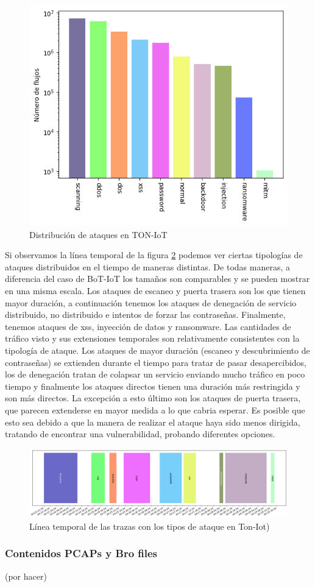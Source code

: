 \begin{figure}[H]
  \begin{center}
      \includegraphics[width=0.49\linewidth]{media/toniot_csv_results.png}
  \end{center}
  \captionsetup{justification=centering}
  \caption{Distribución de ataques en TON-IoT}\label{fig:toniot_results}
\end{figure}

Si observamos la línea temporal de la figura \ref{fig:toniot_timeline} podemos ver ciertas tipologías de ataques distribuidos en el tiempo de maneras distintas. De todas maneras, a diferencia del caso de BoT-IoT los tamaños son comparables y se pueden mostrar en una misma escala. Los ataques de escaneo y puerta trasera son los que tienen mayor duración, a continuación tenemos los ataques de denegación de servicio distribuido, no distribuido e intentos de forzar las contraseñas. Finalmente, tenemos ataques de xss, inyección de datos y ransomware. Las cantidades de tráfico visto y sus extensiones temporales son relativamente consistentes con la tipología de ataque. Los ataques de mayor duración (escaneo y descubrimiento de contraseñas) se extienden durante el tiempo para tratar de pasar desapercibidos, los de denegación tratan de colapsar un servicio enviando mucho tráfico en poco tiempo y finalmente los ataques directos tienen una duración más restringida y son más directos. La excepción a esto último son los ataques de puerta trasera, que parecen extenderse en mayor medida a lo que cabria esperar. Es posible que esto sea debido a que la manera de realizar el ataque haya sido menos dirigida, tratando de encontrar una vulnerabilidad, probando diferentes opciones.

\begin{figure}[!htb]
  \begin{center}
      \includegraphics[width=1\linewidth]{media/toniot_csv_timeline.png}
  \end{center}
  \captionsetup{justification=centering}
  \caption{Línea temporal de las trazas con los tipos de ataque en Ton-Iot)}\label{fig:toniot_timeline}
\end{figure}

\subsubsection{Contenidos PCAPs y Bro files}

(por hacer)
